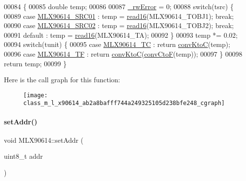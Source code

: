 \begin{DoxyCode}
00084                                                           \{
00085     \textcolor{keywordtype}{double} temp;
00086 
00087     \mbox{\hyperlink{class_m_l_x90614_a8c203cc9359c283d07682ba7dbcc5de3}{\_rwError}} = 0;
00088     \textcolor{keywordflow}{switch}(tsrc) \{
00089         \textcolor{keywordflow}{case} \mbox{\hyperlink{class_m_l_x90614_a500f8c49b00e725d5c201092d9c02b8ba91f620721ea47dec379db791d735a55b}{MLX90614\_SRC01}} : temp = \mbox{\hyperlink{class_m_l_x90614_ad7fb030682918c5c9ae6292962527b44}{read16}}(MLX90614\_TOBJ1); \textcolor{keywordflow}{break};
00090         \textcolor{keywordflow}{case} \mbox{\hyperlink{class_m_l_x90614_a500f8c49b00e725d5c201092d9c02b8baa8763ed94d24c7d2a45fcec6d7183643}{MLX90614\_SRC02}} : temp = \mbox{\hyperlink{class_m_l_x90614_ad7fb030682918c5c9ae6292962527b44}{read16}}(MLX90614\_TOBJ2); \textcolor{keywordflow}{break};
00091         default : temp = \mbox{\hyperlink{class_m_l_x90614_ad7fb030682918c5c9ae6292962527b44}{read16}}(MLX90614\_TA);
00092     \}
00093     temp *= 0.02;
00094     \textcolor{keywordflow}{switch}(tunit) \{
00095         \textcolor{keywordflow}{case} \mbox{\hyperlink{class_m_l_x90614_a18769519e647d93c959566b81d2e514fa75d66a29cab65ff4514b5cd6a268c7bf}{MLX90614\_TC}} : \textcolor{keywordflow}{return} \mbox{\hyperlink{class_m_l_x90614_af0a52019a3c66f0ae3b954a4e7475c88}{convKtoC}}(temp);
00096         \textcolor{keywordflow}{case} \mbox{\hyperlink{class_m_l_x90614_a18769519e647d93c959566b81d2e514fa34f399de3c986d3eede0268f6a34a96b}{MLX90614\_TF}} : \textcolor{keywordflow}{return} \mbox{\hyperlink{class_m_l_x90614_af0a52019a3c66f0ae3b954a4e7475c88}{convKtoC}}(\mbox{\hyperlink{class_m_l_x90614_a2a5b34da155086b85fb74ceb7310b2cb}{convCtoF}}(temp));
00097     \}
00098     \textcolor{keywordflow}{return} temp;
00099 \}
\end{DoxyCode}
Here is the call graph for this function\+:\nopagebreak
\begin{figure}[H]
\begin{center}
\leavevmode
\texttt{[image: class\_m\_l\_x90614\_ab2a8bafff744a249325105d238bfe248\_cgraph]}
\end{center}
\end{figure}
\mbox{\label{class_m_l_x90614_a3d8646faede1c0adc667c54a0c95a7db}} 
\paragraph{\texorpdfstring{set\+Addr()}{setAddr()}}
{\footnotesize\ttfamily void M\+L\+X90614\+::set\+Addr (\begin{DoxyParamCaption}\item[{uint8\+\_\+t}]{addr }\end{DoxyParamCaption})\hspace{0.3cm}{\ttfamily [private]}}



